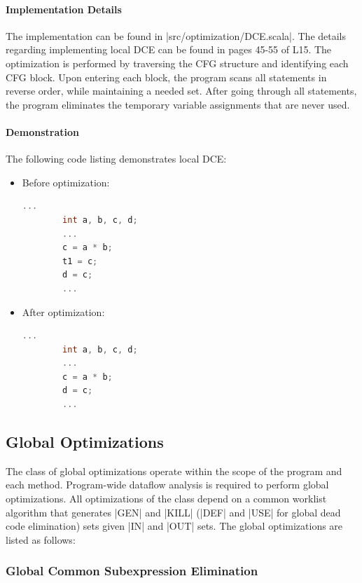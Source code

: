 \paragraph{Implementation Details}

The implementation can be found in |src/optimization/DCE.scala|. The details regarding implementing local DCE can be found in pages 45-55 of L15. The optimization is performed by traversing the CFG structure and identifying each CFG block. Upon entering each block, the program scans all statements in reverse order, while maintaining a needed set. After going through all statements, the program eliminates the temporary variable assignments that are never used.

\paragraph{Demonstration}

The following code listing demonstrates local DCE:

\begin{itemize}
    \item Before optimization:
    \begin{lstlisting}[language=C]
        ...
        int a, b, c, d;
        ...
        c = a * b;
        t1 = c;
        d = c;
        ...
    \end{lstlisting}
    \item After optimization:
    \begin{lstlisting}[language=C]
        ...
        int a, b, c, d;
        ...
        c = a * b;
        d = c;
        ...
    \end{lstlisting}
\end{itemize}

\subsection{Global Optimizations}

The class of global optimizations operate within the scope of the program and each method. Program-wide dataflow analysis is required to perform global optimizations. All optimizations of the class depend on a common worklist algorithm that generates |GEN| and |KILL| (|DEF| and |USE| for global dead code elimination) sets given |IN| and |OUT| sets. The global optimizations are listed as follows:

\subsubsection{Global Common Subexpression Elimination}


